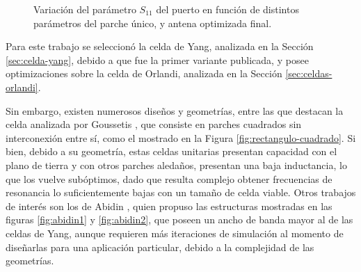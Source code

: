 \begin{figure}[htp]
	\centering 
	\hspace{30pt}
	\hspace{30pt}
	\hspace{30pt}
	\caption{Variación del parámetro $S_{11}$ del puerto en función de distintos parámetros del parche único, y antena optimizada final.}
	\label{fig:posibles-geometrias}
\end{figure}

Para este trabajo se seleccionó la celda de Yang, analizada en la Sección \ref{sec:celda-yang}, debido a que fue la primer variante publicada, y posee optimizaciones sobre la celda de Orlandi, analizada en la Sección \ref{sec:celdas-orlandi}.

Sin embargo, existen numerosos diseños y geometrías, entre las que destacan la celda analizada por Goussetis \cite{Goussetis:TailoringAMCEBGCharacteristics}, que consiste en parches cuadrados sin interconexión entre sí, como el mostrado en la Figura \ref{fig:rectangulo-cuadrado}. Si bien, debido a su geometría, estas celdas unitarias presentan capacidad con el plano de tierra y con otros parches aledaños, presentan una baja inductancia, lo que los vuelve subóptimos, dado que resulta complejo obtener frecuencias de resonancia lo suficientemente bajas con un tamaño de celda viable. Otros trabajos de interés son los de Abidin \cite{Abidin:Thesis}, quien propuso las estructuras mostradas en las figuras \ref{fig:abidin1} y \ref{fig:abidin2}, que poseen un ancho de banda mayor al de las celdas de Yang, aunque requieren más iteraciones de simulación al momento de diseñarlas para una aplicación particular, debido a la complejidad de las geometrías.

